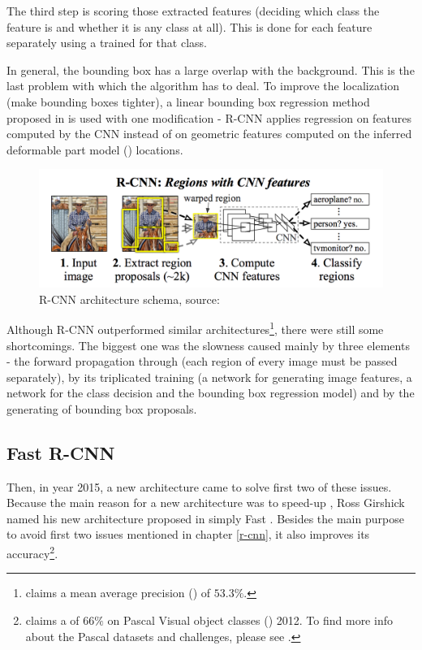 The third step is scoring those extracted features (deciding which class the 
feature is and whether it is any class at all). This is done for each feature 
separately using a  trained for that class.

In general, the bounding box has a large overlap with the background. This is 
the last problem with which the algorithm has to deal. To improve the 
localization (make bounding boxes tighter), a linear bounding box regression 
method proposed in \cite{object-det} is used with one modification - R-CNN 
applies regression on features computed by the CNN instead of on geometric 
features computed on the inferred deformable part model () locations.

\begin{figure}[H]
   \centering
	\includegraphics[width=.9\linewidth]{./pictures/rcnn.png}
	\caption[R-CNN architecture]{R-CNN architecture schema, source: \cite{rcnn}}
      \label{fig:rcnn}
\end{figure}

Although R-CNN outperformed similar architectures\footnote{\cite{rcnn} claims a 
mean average precision () of $53.3 \%$.}, there were still some 
shortcomings. The biggest one was the slowness caused mainly by three elements - 
the forward propagation through  (each region of every image must be 
passed separately), by its triplicated training (a network for generating image 
features, a network for the class decision and the bounding box regression 
model) and by the generating of bounding box proposals.

\subsection{Fast R-CNN}
\label{fast-rcnn}

Then, in year 2015, a new architecture came to solve first two of these issues. 
Because the main reason for a new architecture was to speed-up , Ross 
Girshick named his new architecture proposed in \cite{fast-rcnn} simply Fast 
. Besides the main purpose to avoid first two issues mentioned in 
chapter \ref{r-cnn}, it also improves its accuracy\footnote{\cite{fast-rcnn} 
claims a  of $66 \%$ on Pascal Visual object classes () 2012. To 
find more info about the Pascal  datasets and challenges, please see 
\cite{voc}.}.

